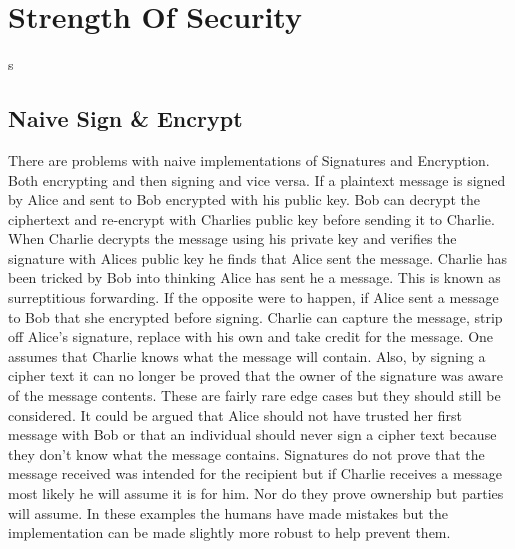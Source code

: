 
\chapter{Strength Of Security}
\label{stre}

s
\section{Naive Sign \& Encrypt}

There are problems with naive implementations of Signatures and Encryption. Both encrypting and then signing and vice versa. If a plaintext message is signed by Alice and sent to Bob encrypted with his public key. Bob can decrypt the ciphertext and re-encrypt with Charlies public key before sending it to Charlie. When Charlie decrypts the message using his private key and verifies the signature with Alices public key he finds that Alice sent the message. Charlie has been tricked by Bob into thinking Alice has sent he a message. This is known as surreptitious forwarding. If the opposite were to happen, if Alice sent a message to Bob that she encrypted before signing. Charlie can capture the message, strip off Alice's signature, replace with his own and take credit for the message. One assumes that Charlie knows what the message will contain. Also, by signing a cipher text it can no longer be proved that the owner of the signature was aware of the message contents. These are fairly rare edge cases but they should still be considered. It could be argued that Alice should not have trusted her first message with Bob or that an individual should never sign a cipher text because they don't know what the message contains. Signatures do not prove that the message received was intended for the recipient but if Charlie receives a message most likely he will assume it is for him. Nor do they prove ownership but parties will assume. In these examples the humans have made mistakes but the implementation can be made slightly more robust to help prevent them\cite{signencrypt}.

